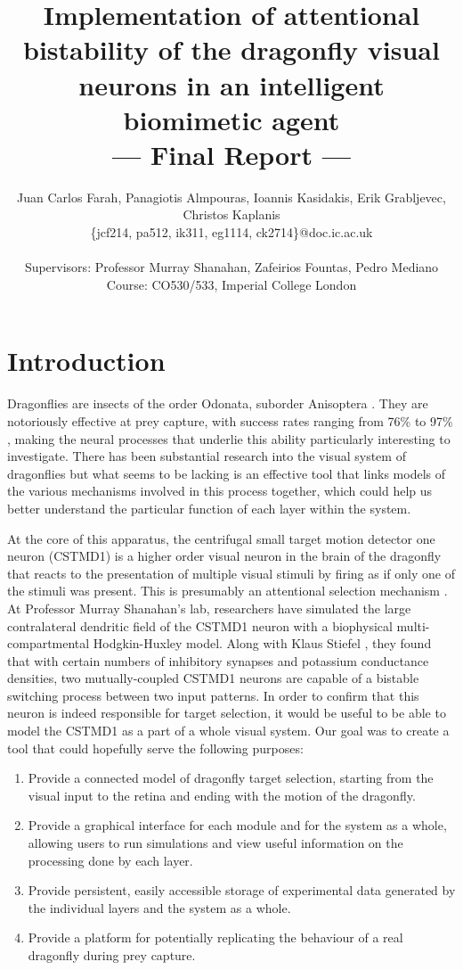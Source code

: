 \documentclass[a4paper,11pt]{article}
\title{Implementation of attentional bistability of the dragonfly visual neurons in an intelligent biomimetic agent\\\Large{--- Final Report ---}}
\author{Juan Carlos Farah, Panagiotis Almpouras, Ioannis Kasidakis, Erik Grabljevec, Christos Kaplanis\\
       \{jcf214, pa512, ik311, eg1114, ck2714\}@doc.ic.ac.uk\\ \\
       \small{Supervisors: Professor Murray Shanahan, Zafeirios Fountas, Pedro Mediano}\\
       \small{Course: CO530/533, Imperial College London}
}
\begin{document}
\maketitle

\tableofcontents

\clearpage
\section{Introduction}

Dragonflies are insects of the order Odonata, suborder Anisoptera \cite{dfwiki}. They are notoriously effective at prey capture, with success rates ranging from 76\% to 97\% \cite{Olberg2011}, making the neural processes that underlie this ability particularly interesting to investigate. There has been substantial research into the visual system of dragonflies \cite{Wiederman2008, w13} but what seems to be lacking is an effective tool that links models of the various mechanisms involved in this process together, which could help us better understand the particular function of each layer within the system.

At the core of this apparatus, the centrifugal small target motion detector one neuron (CSTMD1) is a higher order visual neuron in the brain of the dragonfly that reacts to the presentation of multiple visual stimuli by firing as if only one of the stimuli was present. This is presumably an attentional selection mechanism \cite{w13}. At Professor Murray Shanahan's lab, researchers have simulated the large contralateral dendritic field of the CSTMD1 neuron with a biophysical multi-compartmental Hodgkin-Huxley model. Along with Klaus Stiefel \cite{ne13}, they found that with certain numbers of inhibitory synapses and potassium conductance densities, two mutually-coupled CSTMD1 neurons are capable of a bistable switching process between two input patterns. In order to confirm that this neuron is indeed responsible for target selection, it would be useful to be able to model the CSTMD1 as a part of a whole visual system. Our goal was to create a tool that could hopefully serve the following purposes:
\begin{enumerate}
\item Provide a connected model of dragonfly target selection, starting from the visual input to the retina and ending with the motion of the dragonfly.
\item Provide a graphical interface for each module and for the system as a whole, allowing users to run simulations and view useful information on the processing done by each layer.
\item Provide persistent, easily accessible storage of experimental data generated by the individual layers and the system as a whole.
\item Provide a platform for potentially replicating the behaviour of a real dragonfly during prey capture.
\end{enumerate}
\end{document}
